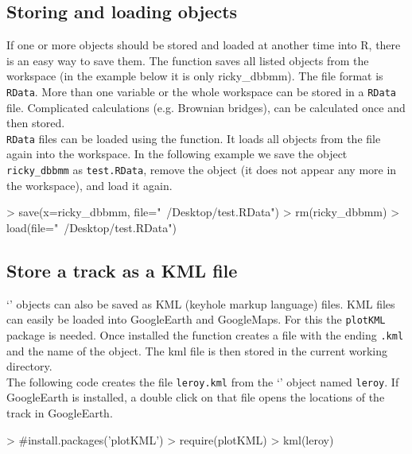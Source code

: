\documentclass[article,nojss]{jss}
\newcommand{\fct}[1]{{\code{#1()}}}
\newcommand{\class}[1]{{`\code{#1}'}}
\begin{document}
\subsection{Storing and loading objects}
If one or more objects should be stored and loaded at another time into R, there is an easy way to save them. The \fct{save} function saves all listed objects from the workspace (in the example below it is only ricky\_dbbmm). The file format is \texttt{RData}. More than one variable or the whole workspace can be stored in a \texttt{RData} file. Complicated calculations (e.g. Brownian bridges), can be calculated once and then stored. \\
\texttt{RData} files can be loaded using the \fct{load} function. It loads all objects from the file again into the workspace. In the following example we save the object \texttt{ricky\_dbbmm} as \texttt{test.RData}, remove the object (it does not appear any more in the workspace), and load it again.

\begin{Schunk}
\begin{Sinput}
> save(x=ricky_dbbmm, file="~/Desktop/test.RData")
> rm(ricky_dbbmm)
> load(file="~/Desktop/test.RData")
\end{Sinput}
\end{Schunk}


\subsection{Store a track as a KML file}
\class{Move} objects can also be saved as KML (keyhole markup language) files. KML files can easily be loaded into GoogleEarth and GoogleMaps. For this the \texttt{plotKML} package is needed. Once installed the \fct{kml} function creates a file with the ending \texttt{.kml} and the name of the object. The kml file is then stored in the current working directory. \\
The following code creates the file \texttt{leroy.kml} from the \class{Move} object named \texttt{leroy}. If GoogleEarth is installed, a double click on that file opens the locations of the track in GoogleEarth.

\begin{Schunk}
\begin{Sinput}
> #install.packages('plotKML')
> require(plotKML)
> kml(leroy)
\end{Sinput}
\end{Schunk}


\end{document}
